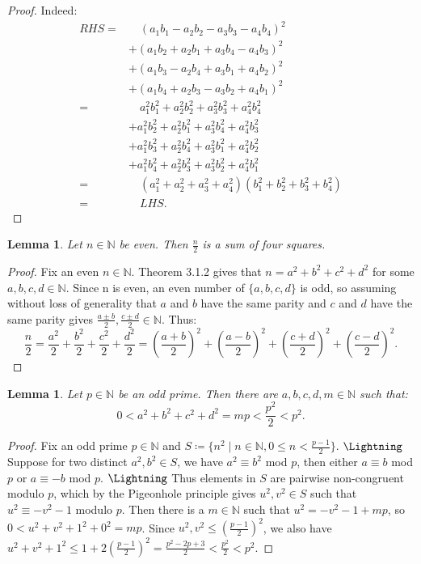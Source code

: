 \documentclass{report}
\newcommand{\N}{\mathbb{N}}
\newtheorem{lemma}[theorem]{Lemma}
\theoremstyle{definition}\newtheorem*{definition}{Definition}
\theoremstyle{definition}\newtheorem*{example}{Example}
\theoremstyle{remark}\newtheorem*{remark}{Remark}
\begin{document}
\begin{proof}
Indeed:
\begin{align*}
RHS
= & \quad (a_1 b_1 - a_2 b_2 - a_3 b_3 - a_4 b_4)^2 \\
& + (a_1 b_2 + a_2 b_1 + a_3 b_4 - a_4 b_3)^2 \\
& + (a_1 b_3 - a_2 b_4 + a_3 b_1 + a_4 b_2)^2 \\
& + (a_1 b_4 + a_2 b_3 - a_3 b_2 + a_4 b_1)^2 \\
= & \quad a_1^2 b_1^2 + a_2^2 b_2^2 + a_3^2 b_3^2 + a_4^2 b_4^2 \\
& + a_1^2 b_2^2 + a_2^2 b_1^2 + a_3^2 b_4^2 + a_4^2 b_3^2 \\
& + a_1^2 b_3^2 + a_2^2 b_4^2 + a_3^2 b_1^2 + a_4^2 b_2^2 \\
& + a_1^2 b_4^2 + a_2^2 b_3^2 + a_3^2 b_2^2 + a_4^2 b_1^2 \\
= & \quad (a_1^2 + a_2^2 + a_3^2 + a_4^2) (b_1^2 + b_2^2 + b_3^2 + b_4^2) \\
= & \quad LHS.
\end{align*}
\end{proof}

\begin{lemma}
\label{lemma:evensum}
Let $ n \in \N $ be even. Then $ \frac{n}{2} $ is a sum of four squares.
\end{lemma}

\begin{proof}
Fix an even $ n \in \N $. Theorem 3.1.2 gives that $ n = a^2 + b^2 + c^2 + d^2 $ for some $ a, b, c, d \in \N $. Since n is even, an even number of $ \{ a, b, c, d \} $ is odd, so assuming without loss of generality that $ a $ and $ b $ have the same parity and $ c $ and $ d $ have the same parity gives $ \frac{a \pm b}{2}, \frac{c \pm d}{2} \in \N $. Thus: $$ \frac{n}{2} = \frac{a^2}{2} + \frac{b^2}{2} + \frac{c^2}{2} + \frac{d^2}{2} = \left( \frac{a + b}{2} \right)^2 + \left( \frac{a - b}{2} \right)^2 + \left( \frac{c + d}{2} \right)^2 + \left( \frac{c - d}{2} \right)^2. $$
\end{proof}

\begin{lemma}
\label{lemma:oddprime}
Let $ p \in \N $ be an odd prime. Then there are $ a, b, c, d, m \in \N $ such that: $$ 0 < a^2 + b^2 + c^2 + d^2 = mp < \frac{p^2}{2} < p^2. $$
\end{lemma}

\begin{proof}
Fix an odd prime $ p \in \N $ and $ S \coloneqq \{ n^2 \mid n \in \N, 0 \le n < \frac{p - 1}{2} \} $. $ \text{\Lightning} $ Suppose for two distinct $ a^2, b^2 \in S $, we have $ a^2 \equiv b^2 $ mod $ p $, then either $ a \equiv b $ mod $ p $ or $ a \equiv -b $ mod $ p $. $ \text{\Lightning} $ Thus elements in $ S $ are pairwise non-congruent modulo $ p $, which by the Pigeonhole principle gives $ u^2, v^2 \in S $ such that $ u^2 \equiv -v^2 - 1 $ modulo $ p $. Then there is a $ m \in \N $ such that $ u^2 = -v^2 - 1 + mp $, so $ 0 < u^2 + v^2 + 1^2 + 0^2 = mp $. Since $ u^2, v^2 \le \left( \frac{p - 1}{2} \right)^2 $, we also have $ u^2 + v^2 + 1^2 \le 1 + 2 \left( \frac{p - 1}{2} \right)^2 = \frac{p^2 - 2p + 3}{2} < \frac{p^2}{2} < p^2 $.
\end{proof}
\end{document}
